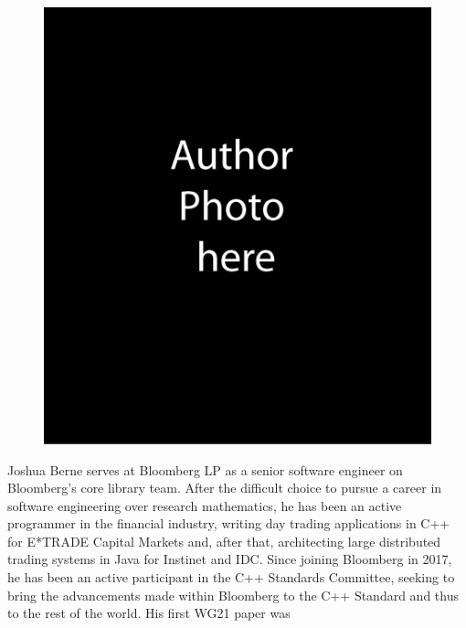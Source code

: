\vspace*{18pt} %
\begin{figure}\includegraphics{cawp-authorphoto-JMB}%
\end{figure} \noindent Joshua Berne serves at Bloomberg LP as a senior
software engineer on Bloomberg’s core library team. After the difficult choice
to pursue a career in software engineering over research mathematics, he has
been an active programmer in the financial industry, writing day trading
applications in C++ for E*TRADE Capital Markets and, after that, architecting
large distributed trading systems in Java for Instinet and IDC. Since joining
Bloomberg in 2017, he has been an active participant in the C++ Standards
Committee, seeking to bring the advancements made within Bloomberg to the
C++ Standard and thus to the rest of the world.  His first WG21 paper was
\cite{wg21P1332R0}

